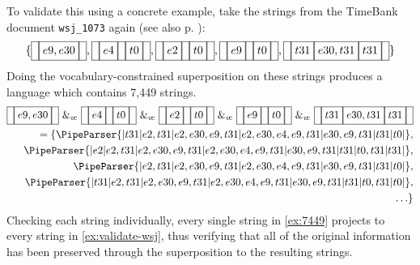 \documentclass[a4paper,12pt,leqno,twoside]{article}
\newcommand{\vph}[1]{\vphantom{#1}}
\newcommand{\ebox}[1]{\fbox{$\vph{'(),}#1$}}
\newcommand{\nbBefore}[2]{\ebox{#1}\ebox{}\ebox{#2}}
\newcommand{\nbDuring}[2]{\ebox{#2}\ebox{#1,#2}\ebox{#2}}
\newcommand{\nbEquals}[2]{\ebox{#1,#2}}
\newcommand{\Before}[2]{\ebox{}\nbBefore{#1}{#2}\ebox{}}
\newcommand{\During}[2]{\ebox{}\nbDuring{#1}{#2}\ebox{}}
\newcommand{\Equals}[2]{\ebox{}\nbEquals{#1}{#2}\ebox{}}
\newcommand{\spvc}{~\&_{v\!c}~}
\newcommand{\EventString}[1]{%
	\renewcommand*{\do}[1]{\ebox{##1}}%
	\PipeParser{#1}%
}
\begin{document}
To validate this using a concrete example, take the strings from the TimeBank document \verb|wsj_1073| again (see also p. \pageref{fig:case-study-tlinks}):
\begin{align}
	\{\Equals{e9}{e30}, \Before{e4}{t0}, \Before{e2}{t0}, \Before{e9}{t0}, \During{e30}{t31}\}\label{ex:validate-wsj}
\end{align}
Doing the vocabulary-constrained superposition on these strings produces a language which contains 7,449 strings.
\begin{align}
	\Equals{e9}{e30} \spvc \Before{e4}{t0} \spvc \Before{e2}{t0} \spvc \Before{e9}{t0} \spvc \During{e30}{t31}\\
	= \{ \EventString{{}|t31|e2,t31|e2,e30,e9,t31|e2,e30,e4,e9,t31|e30,e9,t31|t31|t0|{}},\label{ex:7449}\\
	\EventString{{}|e2|e2,t31|e2,e30,e9,t31|e2,e30,e4,e9,t31|e30,e9,t31|t31|t0,t31|t31|{}},\notag\\
	\EventString{{}|e2,t31|e2,e30,e9,t31|e2,e30,e4,e9,t31|e30,e9,t31|t31|t0|{}},\notag\\
	\EventString{{}|t31|e2,t31|e2,e30,e9,t31|e2,e30,e4,e9,t31|e30,e9,t31|t31|t0,t31|t0|{}},\notag\\
	\ldots \}\notag
\end{align}
Checking each string individually, every single string in \cref{ex:7449} projects to every string in \cref{ex:validate-wsj}, thus verifying that all of the original information has been preserved through the superposition to the resulting strings.
\end{document}
